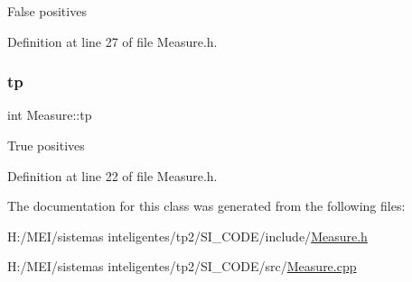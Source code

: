 False positives 

Definition at line 27 of file Measure.\+h.

\mbox{\label{class_measure_a88e0c0f67850429f30650a2b7e7076aa}} 
\subsubsection{\texorpdfstring{tp}{tp}}
{\footnotesize\ttfamily int Measure\+::tp\hspace{0.3cm}{\ttfamily [protected]}}

True positives 

Definition at line 22 of file Measure.\+h.



The documentation for this class was generated from the following files\+:\begin{DoxyCompactItemize}
\item 
H\+:/\+M\+E\+I/sistemas inteligentes/tp2/\+S\+I\+\_\+\+C\+O\+D\+E/include/\hyperlink{_measure_8h}{Measure.\+h}\item 
H\+:/\+M\+E\+I/sistemas inteligentes/tp2/\+S\+I\+\_\+\+C\+O\+D\+E/src/\hyperlink{_measure_8cpp}{Measure.\+cpp}\end{DoxyCompactItemize}
